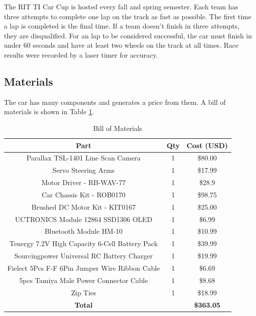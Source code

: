 \documentclass[conference]{IEEEtran}
\begin{document}
The RIT TI Car Cup is hosted every fall and spring semester. Each team has three attempts to complete one lap on the track as fast as possible. The first time a lap is completed is the final time. If a team doesn't finish in three attempts, they are disqualified. For an lap to be considered successful, the car must finish in under 60 seconds and have at least two wheels on the track at all times. Race results were recorded by a laser timer for accuracy.

\subsection{Materials}

The car has many components and generates a price from them. A bill of materials is shown in Table \ref{table:billOfMaterials}. 

\begin{table}[htbp]
\caption{Bill of Materials}
\begin{center}
\begin{tabular}{|c|c|c|}
\hline
Part & Qty & Cost (USD) \\
\hline
Parallax TSL-1401 Line Scan Camera & 1 & \$80.00 \\
\hline
Servo Steering Arms & 1 & \$17.99 \\
\hline
Motor Driver - RB-WAV-77 & 1 & \$28.9 \\
\hline
Car Chassis Kit - ROB0170 & 1 & \$98.75 \\
\hline
Brushed DC Motor Kit - KIT0167 & 1 & \$25.00 \\
\hline
UCTRONICS Module 12864 SSD1306 OLED & 1 & \$6.99 \\
\hline
Bluetooth Module HM-10 & 1 & \$10.99 \\
\hline
Tenergy 7.2V High Capacity 6-Cell Battery Pack & 1 & \$39.99 \\
\hline
Sourcingpower Universal RC Battery Charger & 1 & \$19.99 \\
\hline
Fielect 5Pcs F-F 6Pin Jumper Wire Ribbon Cable & 1 & \$6.69 \\
\hline
5pcs Tamiya Male Power Connector Cable & 1 & \$8.68 \\
\hline
Zip Ties & 1 & \$18.99 \\
\hline
\textbf{Total} & & \textbf{\$363.05} \\
\hline
\end{tabular}
\label{table:billOfMaterials}
\end{center}
\end{table}
\end{document}

